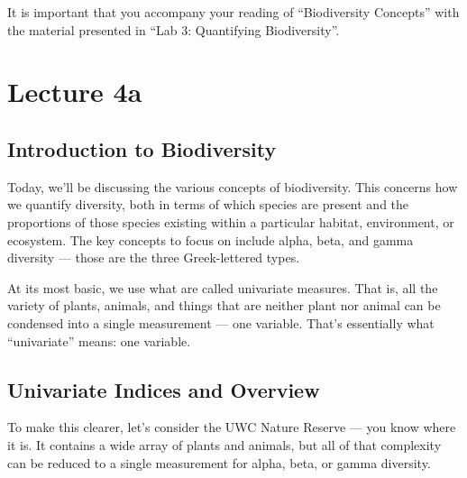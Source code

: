 \documentclass[
  10pt,
]{book}
\begin{document}
\begin{tcolorbox}[enhanced jigsaw, colframe=quarto-callout-note-color-frame, opacityback=0, leftrule=.75mm, toprule=.15mm, rightrule=.15mm, bottomtitle=1mm, toptitle=1mm, colback=white, title=\textcolor{quarto-callout-note-color}{\faInfo}\hspace{0.5em}{Also see:}, titlerule=0mm, breakable, bottomrule=.15mm, left=2mm, arc=.35mm, coltitle=black, opacitybacktitle=0.6, colbacktitle=quarto-callout-note-color!10!white]

It is important that you accompany your reading of ``Biodiversity
Concepts'' with the material presented in ``Lab 3: Quantifying
Biodiversity''.

\end{tcolorbox}

\chapter*{Lecture 4a}\label{lecture-4a}

\section{Introduction to
Biodiversity}\label{introduction-to-biodiversity}

Today, we'll be discussing the various concepts of biodiversity. This
concerns how we quantify diversity, both in terms of which species are
present and the proportions of those species existing within a
particular habitat, environment, or ecosystem. The key concepts to focus
on include alpha, beta, and gamma diversity --- those are the three
Greek-lettered types.

At its most basic, we use what are called univariate measures. That is,
all the variety of plants, animals, and things that are neither plant
nor animal can be condensed into a single measurement --- one variable.
That's essentially what ``univariate'' means: one variable.

\section{Univariate Indices and
Overview}\label{univariate-indices-and-overview}

To make this clearer, let's consider the UWC Nature Reserve --- you know
where it is. It contains a wide array of plants and animals, but all of
that complexity can be reduced to a single measurement for alpha, beta,
or gamma diversity.
\end{document}
